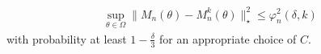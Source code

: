 \documentclass[twoside,11pt]{article}
\newlength{\widebarargwidth}
\newlength{\widebarargheight}
\newlength{\widebarargdepth}
\DeclareRobustCommand{\widebar}[1]{%
  \settowidth{\widebarargwidth}{\ensuremath{#1}}%
  \settoheight{\widebarargheight}{\ensuremath{#1}}%
  \settodepth{\widebarargdepth}{\ensuremath{#1}}%
  \addtolength{\widebarargwidth}{-0.3\widebarargheight}%
  \addtolength{\widebarargwidth}{-0.3\widebarargdepth}%
  \makebox[0pt][l]{\hspace{0.3\widebarargheight}%
    \hspace{0.3\widebarargdepth}%
    \addtolength{\widebarargheight}{0.3ex}%
    \rule[\widebarargheight]{0.95\widebarargwidth}{0.1ex}}%
  {#1}}
\newcommand{\numobs}{\ensuremath{n}}
\newcommand{\norm}[1]{\ensuremath{\|#1\|_2}}
\newcommand{\subsize}{\numobs} %
\newcommand{\subprob}{\delta}
\newcommand{\consteps}{C_\epsilon}
\newcommand{\nstates}{s}
\newcommand{\pistat}{\ensuremath{\widebar{\pi}}}
\newcommand{\stat}{\pistat}
\newcommand{\statmin}{\stat_{\min}}
\newcommand{\mixcoefeff}{\ensuremath{\widetilde{\rho}_{\mathrm{mix}}}}
\newcommand{\mixcoefeps}{\ensuremath{\epsilon_{\mathrm{mix}}}}
\newcommand{\paramjoint}{\theta}
\newcommand{\addnorm}[1]{\| #1 \|_{\star}}
\newcommand{\emopsampn}[2]{M_{#1}(#2)}
\newcommand{\emopsamptruncn}[2]{M^k_{#1}(#2)}
\newcommand{\samperror}[1]{e_{#1}}
\newcommand{\DomTheta}{\ensuremath{\Omega}}
\newcommand{\kdim}{\ensuremath{k}}
\newcommand{\BOUNDFUN}{\ensuremath{\varphi}}
\newcommand{\mustar}{\ensuremath{\mu^*}}
\begin{document}
\begin{align*}
   \sup_{\paramjoint \in \DomTheta} \addnorm{\emopsampn{\subsize}{\theta} -
 \emopsamptruncn{\subsize}{\theta}}^2\leq \BOUNDFUN_{\subsize}^2(\delta, \kdim)
\end{align*}
with probability at least $1-\frac{\delta}{3}$ for an appropriate choice of  $C$. \\
\end{document}
